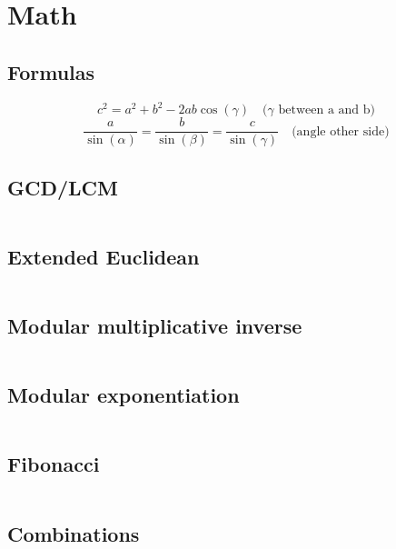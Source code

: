 \section{Math}
\subsection{Formulas}
\begin{equation}
c^2 = a^2 + b^2 - 2 a b \cos(\gamma) \quad \textrm{($\gamma$ between a and b)}
\end{equation}
\begin{equation}
\frac{a}{\sin(\alpha)} = \frac{b}{\sin(\beta)} = \frac{c}{\sin(\gamma)} \quad \textrm{(angle other side)}
\end{equation}

\subsection{GCD/LCM}
\inputminted[frame=single,framesep=3pt,tabsize=2,breaklines=true,linenos,label=O(log(K))]{c++}{math/gcd.cpp}

\subsection{Extended Euclidean}
\inputminted[frame=single,framesep=3pt,tabsize=2,breaklines=true,linenos,label=O(log(K))]{c++}{math/extgcd.cpp}

\subsection{Modular multiplicative inverse}
\inputminted[frame=single,framesep=3pt,tabsize=2,breaklines=true,linenos,label=O(log(K))]{c++}{math/mod-mult-inverse.cpp}

\subsection{Modular exponentiation}
\inputminted[frame=single,framesep=3pt,tabsize=2,breaklines=true,linenos,label=O(log(K))]{c++}{math/expmod.cpp}

\subsection{Fibonacci}
\inputminted[frame=single,framesep=3pt,tabsize=2,breaklines=true,linenos,label=O(N)]{c++}{math/fib.cpp}

\subsection{Combinations}
\inputminted[frame=single,framesep=3pt,tabsize=2,breaklines=true,linenos,label=O($N^2$)]{c++}{math/combinations.cpp}

